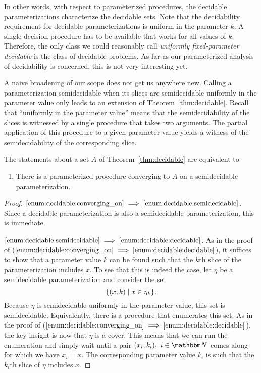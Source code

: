 In other words, with respect to parameterized procedures, the decidable parameterizations characterize the decidable sets.
Note that the decidability requirement for decidable parameterizations is uniform in the parameter $k$:
A single decision procedure has to be available that works for all values of $k$.
Therefore, the only class we could reasonably call \emph{uniformly fixed-parameter decidable} is the class of decidable problems.
As far as our parameterized analysis of decidability is concerned, this is not very interesting yet.

A naive broadening of our scope does not get us anywhere new.
Calling a parameterization semidecidable when its slices are semidecidable uniformly in the parameter value only leads to an extension of Theorem~\ref{thm:decidable}.
Recall that \enquote{uniformly in the parameter value} means that the semidecidability of the slices is witnessed by a single procedure that takes two arguments.
The partial application of this procedure to a given parameter value yields a witness of the semidecidability of the corresponding slice.
\begin{theorem}
  The statements about a set $A$ of Theorem~\ref{thm:decidable} are equivalent to
  \begin{enumerate}
  \item\label{enum:decidable:semidecidable}
    There is a parameterized procedure converging to $A$ on a semidecidable parameterization.
  \end{enumerate}
\end{theorem}
\begin{proof}
$\ref{enum:decidable:converging_on} \implies \ref{enum:decidable:semidecidable}$.
  Since a decidable parameterization is also a semidecidable parameterization, this is immediate.

$\ref{enum:decidable:semidecidable} \implies \ref{enum:decidable:decidable}$.
  As in the proof of ($\ref{enum:decidable:converging_on} \implies \ref{enum:decidable:decidable}$), it suffices to show that a parameter value $k$ can be found such that the $k$th slice of the parameterization includes $x$.
  To see that this is indeed the case, let $\eta$ be a semidecidable parameterization and consider the set
  \begin{equation*}
    \{(x, k) \;|\; x \in \eta_k\}.
  \end{equation*}
  Because $\eta$ is semidecidable uniformly in the parameter value, this set is semidecidable.
  Equivalently, there is a procedure that enumerates this set.
  As in the proof of ($\ref{enum:decidable:converging_on} \implies \ref{enum:decidable:decidable}$), the key insight is now that $\eta$ is a cover.
  This means that we can run the enumeration and simply wait until a pair $(x_i, k_i),\ i \in \bbN$ comes along for which we have $x_i = x$.
  The corresponding parameter value $k_i$ is such that the $k_i$th slice of $\eta$ includes $x$.
\end{proof}

